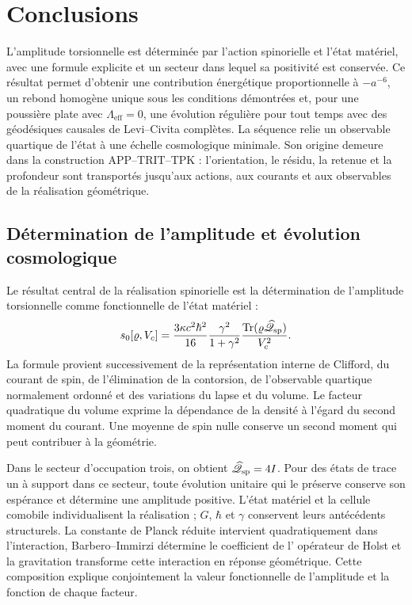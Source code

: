 \section{Conclusions}
\label{vii:sec:conclusiones}

L'amplitude torsionnelle est déterminée par l'action spinorielle et
l'état matériel, avec une formule explicite et un secteur dans lequel sa
positivité est conservée. Ce résultat permet d'obtenir une contribution
énergétique proportionnelle à \(-a^{-6}\), un rebond homogène unique sous les
conditions démontrées et, pour une poussière plate avec
\(\Lambda_{\mathrm{eff}}=0\), une évolution régulière pour tout temps avec
des géodésiques causales de Levi--Civita complètes. La séquence relie un
observable quartique de l'état à une échelle cosmologique minimale. Son
origine demeure dans la construction APP--TRIT--TPK : l'orientation, le résidu,
la retenue et la profondeur sont transportés jusqu'aux actions, aux courants et aux
observables de la réalisation géométrique.

\subsection{Détermination de l'amplitude et évolution cosmologique}

Le résultat central de la réalisation spinorielle est la détermination
de l'amplitude torsionnelle comme fonctionnelle de l'état matériel :
\[
 s_0[\varrho,V_c]
 =\frac{3\kappa c^2\hbar^2}{16}
   \frac{\gamma^2}{1+\gamma^2}
   \frac{\operatorname{Tr}
    (\varrho\widehat{\mathscr Q}_{\rm sp})}{V_c^2}.
\]
La formule provient successivement de la représentation interne de Clifford, du courant de spin, de l'élimination de la contorsion, de l'observable quartique normalement ordonné et des variations du lapse et du volume. Le facteur quadratique du volume exprime la dépendance de la densité à l'égard du second moment du courant. Une moyenne de spin nulle conserve un second moment qui peut contribuer à la géométrie.

Dans le secteur d'occupation trois, on obtient
\(\widehat{\mathscr Q}_{\rm sp}=4I\). Pour des états de trace un
à support dans ce secteur, toute évolution unitaire qui le préserve
conserve son espérance et détermine une amplitude positive.
L'état matériel et la cellule comobile individualisent la réalisation ;
\(G\), \(\hbar\) et \(\gamma\) conservent leurs antécédents
structurels. La constante de Planck réduite intervient quadratiquement dans
l'interaction, Barbero--Immirzi détermine le coefficient de l'
opérateur de Holst et la gravitation transforme cette interaction en
réponse géométrique. Cette composition explique conjointement
la valeur fonctionnelle de l'amplitude et la fonction de chaque facteur.

